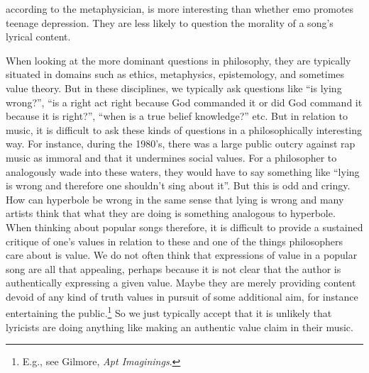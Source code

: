 \documentclass[phdthesis,12pt,final]{wuthesis}
\theoremstyle{definition}
\theoremstyle{definition}
\theoremstyle{definition}
\theoremstyle{definition}
\theoremstyle{remark}
\begin{document}
according to the metaphysician, is more interesting than whether emo promotes teenage depression. They are less likely to question the morality of a song's lyrical content.

When looking at the more dominant questions in philosophy, they are typically situated in domains such as ethics, metaphysics, epistemology, and sometimes value theory. But in these disciplines, we typically ask questions like ``is lying wrong?'', ``is a right act right because God commanded it or did God command it because it is right?'', ``when is a true belief knowledge?'' etc. But in relation to music, it is difficult to ask these kinds of questions in a philosophically interesting way. For instance, during the 1980's, there was a large public outcry against rap music as immoral and that it undermines social values. For a philosopher to analogously wade into these waters, they would have to say something like ``lying is wrong and therefore one shouldn't sing about it''. But this is odd and cringy. How can hyperbole be wrong in the same sense that lying is wrong and many artists think that what they are doing is something analogous to hyperbole. When thinking about popular songs therefore, it is difficult to provide a sustained critique of one's values in relation to these and one of the things philosophers care about is value. We do not often think that expressions of value in a popular song are all that appealing, perhaps because it is not clear that the author is authentically expressing a given value. Maybe they are merely providing content devoid of any kind of truth values in pursuit of some additional aim, for instance entertaining the public.\footnote{E.g., see Gilmore, \emph{Apt {Imaginings}}.} So we just typically accept that it is unlikely that lyricists are doing anything like making an authentic value claim in their music.
\end{document}
